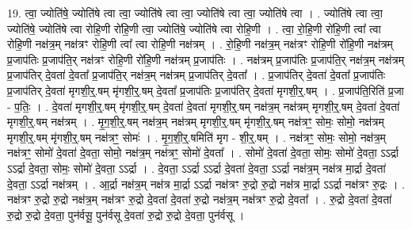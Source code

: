 \documentclass[17pt]{extarticle}
\begin{document}
19. त्वा॒ ज्योति॑षे॒ ज्योति॑षे त्वा त्वा॒ ज्योति॑षे त्वा त्वा॒ ज्योति॑षे त्वा त्वा॒ ज्योति॑षे त्वा । . ज्योति॑षे त्वा त्वा॒ ज्योति॑षे॒ ज्योति॑षे त्वा रोहि॒णी रो॑हि॒णी त्वा॒ ज्योति॑षे॒ ज्योति॑षे त्वा रोहि॒णी । . त्वा॒ रो॒हि॒णी रो॑हि॒णी त्वा᳚ त्वा रोहि॒णी नक्ष॑त्र॒म् नक्ष॑त्रꣳ रोहि॒णी त्वा᳚ त्वा रोहि॒णी नक्ष॑त्रम् । . रो॒हि॒णी नक्ष॑त्र॒म् नक्ष॑त्रꣳ रोहि॒णी रो॑हि॒णी नक्ष॑त्रम् प्र॒जाप॑तिः प्र॒जाप॑ति॒र् नक्ष॑त्रꣳ रोहि॒णी रो॑हि॒णी नक्ष॑त्रम् प्र॒जाप॑तिः । . नक्ष॑त्रम् प्र॒जाप॑तिः प्र॒जाप॑ति॒र् नक्ष॑त्र॒म् नक्ष॑त्रम् प्र॒जाप॑तिर् दे॒वता॑ दे॒वता᳚ प्र॒जाप॑ति॒र् नक्ष॑त्र॒म् नक्ष॑त्रम् प्र॒जाप॑तिर् दे॒वता᳚ । . प्र॒जाप॑तिर् दे॒वता॑ दे॒वता᳚ प्र॒जाप॑तिः प्र॒जाप॑तिर् दे॒वता॑ मृगशी॒र्॒.षम् मृ॑गशी॒र्॒.षम् दे॒वता᳚ प्र॒जाप॑तिः प्र॒जाप॑तिर् दे॒वता॑ मृगशी॒र्॒.षम् । . प्र॒जाप॑ति॒रिति॑ प्र॒जा - प॒तिः॒ । . दे॒वता॑ मृगशी॒र्॒.षम् मृ॑गशी॒र्॒.षम् दे॒वता॑ दे॒वता॑ मृगशी॒र्॒.षम् नक्ष॑त्र॒म् नक्ष॑त्रम् मृगशी॒र्॒.षम् दे॒वता॑ दे॒वता॑ मृगशी॒र्॒.षम् नक्ष॑त्रम् । . मृ॒ग॒शी॒र्॒.षम् नक्ष॑त्र॒म् नक्ष॑त्रम् मृगशी॒र्॒.षम् मृ॑गशी॒र्॒.षम् नक्ष॑त्रꣳ॒॒ सोमः॒ सोमो॒ नक्ष॑त्रम् मृगशी॒र्॒.षम् मृ॑गशी॒र्॒.षम् नक्ष॑त्रꣳ॒॒ सोमः॑ । . मृ॒ग॒शी॒र्॒.षमिति॑ मृग - शी॒र्॒.षम् । . नक्ष॑त्रꣳ॒॒ सोमः॒ सोमो॒ नक्ष॑त्र॒म् नक्ष॑त्रꣳ॒॒ सोमो॑ दे॒वता॑ दे॒वता॒ सोमो॒ नक्ष॑त्र॒म् नक्ष॑त्रꣳ॒॒ सोमो॑ दे॒वता᳚ । . सोमो॑ दे॒वता॑ दे॒वता॒ सोमः॒ सोमो॑ दे॒वता॒ ऽऽर्द्रा ऽऽर्द्रा दे॒वता॒ सोमः॒ सोमो॑ दे॒वता॒ ऽऽर्द्रा । . दे॒वता॒ ऽऽर्द्रा ऽऽर्द्रा दे॒वता॑ दे॒वता॒ ऽऽर्द्रा नक्ष॑त्र॒म् नक्ष॑त्र मा॒र्द्रा दे॒वता॑ दे॒वता॒ ऽऽर्द्रा नक्ष॑त्रम् । . आ॒र्द्रा नक्ष॑त्र॒म् नक्ष॑त्र मा॒र्द्रा ऽऽर्द्रा नक्ष॑त्रꣳ रु॒द्रो रु॒द्रो नक्ष॑त्र मा॒र्द्रा ऽऽर्द्रा नक्ष॑त्रꣳ रु॒द्रः । . नक्ष॑त्रꣳ रु॒द्रो रु॒द्रो नक्ष॑त्र॒म् नक्ष॑त्रꣳ रु॒द्रो दे॒वता॑ दे॒वता॑ रु॒द्रो नक्ष॑त्र॒म् नक्ष॑त्रꣳ रु॒द्रो दे॒वता᳚ । . रु॒द्रो दे॒वता॑ दे॒वता॑ रु॒द्रो रु॒द्रो दे॒वता॒ पुन॑र्वसू॒ पुन॑र्वसू दे॒वता॑ रु॒द्रो रु॒द्रो दे॒वता॒ पुन॑र्वसू । \newline
\end{document}
